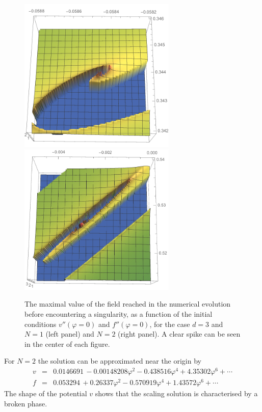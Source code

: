 \documentclass[11pt]{book} %
\newcommand{\bea}{\begin{eqnarray}}
\newcommand{\eea}{\end{eqnarray}}
\begin{document}
\begin{figure}
\includegraphics[width=7.5cm]{spike_d3N1.pdf}
\
\includegraphics[width=7.5cm]{spike_d3N2.pdf}
\caption{The maximal value of the field reached in the numerical
evolution before encountering a singularity, as a function
of the initial conditions $v''(\varphi=0)$ and $f''(\varphi=0)$,
for the case $d=3$ and $N=1$ (left panel) and $N=2$ (right panel).
A clear spike can be seen in the center of each figure.
}
\label{WFN1N2}
\end{figure}

For $N=2$ the solution can be approximated near the origin by
\bea
v&=&0.0146691\, -0.00148208 \varphi ^2-0.438516 \varphi ^4+4.35302 \varphi ^6+\cdots
\nonumber \\
f&=&0.053294\, +0.26337 \varphi ^2-0.570919 \varphi ^4+1.43572 \varphi ^6+\cdots
\nonumber
\eea
The shape of the potential $v$ shows that the scaling solution is characterised by a broken phase.
\end{document}
